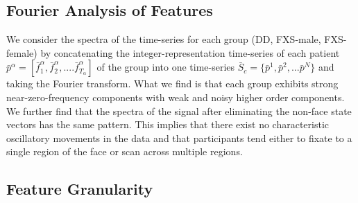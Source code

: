 \documentclass[10pt,twocolumn,letterpaper]{article}
\begin{document}
\subsection{Fourier Analysis of Features}
We consider the spectra of the time-series for each group (DD, FXS-male, FXS-female) by concatenating the integer-representation time-series of each patient $\bar{p}^\alpha=[\bar{f}_1^\alpha, \bar{f}_2^\alpha,....\bar{f}_{T_\alpha}^\alpha]$ of the group into one time-series $\bar{S}_c=\{\bar{p}^1, \bar{p}^2,...\bar{p}^N \}$ and taking the Fourier transform. What we find is that each group exhibits strong near-zero-frequency components with weak and noisy higher order components. We further find that the spectra of the signal after eliminating the non-face state vectors has the same pattern. This implies that there exist no characteristic oscillatory movements in the data and that participants tend either to fixate to a single region of the face or scan across multiple regions. 

\subsection{Feature Granularity}
\end{document}
